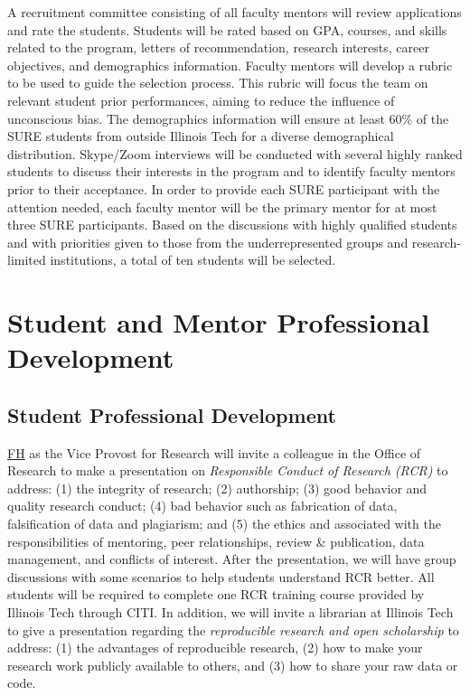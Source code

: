 \documentclass[11pt]{NSFamsart}
\newcommand{\FH}{\hyperlink{FHlink}{FH}\xspace}
\begin{document}
A recruitment committee consisting of all faculty mentors will review applications and rate the students. Students
will be rated based on GPA, courses, and skills related to the program, letters of recommendation,
research interests, career objectives, and demographics information. Faculty mentors
will develop a rubric to be used to guide the selection
process. This rubric will focus the team on relevant student prior performances, aiming to reduce the
influence of unconscious bias. The demographics information will ensure at least 60\% of the SURE students
from outside Illinois Tech for a diverse demographical distribution. Skype/Zoom interviews will be conducted
with several highly ranked students to discuss their interests in the program and to identify faculty
mentors prior to their acceptance. In order to provide each SURE participant with the attention needed,
each faculty mentor will be the primary mentor for at most three SURE participants. Based on the
discussions with highly qualified students and with priorities given to those from the underrepresented
groups and research-limited institutions, a total of ten students will be selected.

\section{Student and Mentor Professional Development}
\subsection{Student Professional Development}
\FH as the Vice Provost for Research will invite a colleague in the  Office of Research to make a presentation on
\emph{Responsible Conduct of Research (RCR)} to address: (1) the integrity of research; (2) authorship;  (3) good behavior
and quality research conduct; (4) bad behavior such as fabrication of data, falsification of data and
plagiarism; and (5) the ethics and associated with the responsibilities of mentoring, peer relationships, review
\& publication, data management, and conflicts of interest. After the presentation, we will have group discussions with some scenarios to help students understand RCR better.
All students will be required to complete one RCR training course provided by Illinois Tech through CITI.  In addition, we will invite a librarian at Illinois Tech to give a presentation regarding the \emph{reproducible research and open scholarship} to address: (1) the advantages of  reproducible research, (2) how to make your research work publicly available to others, and
(3) how to share your raw data or code.
\end{document}
